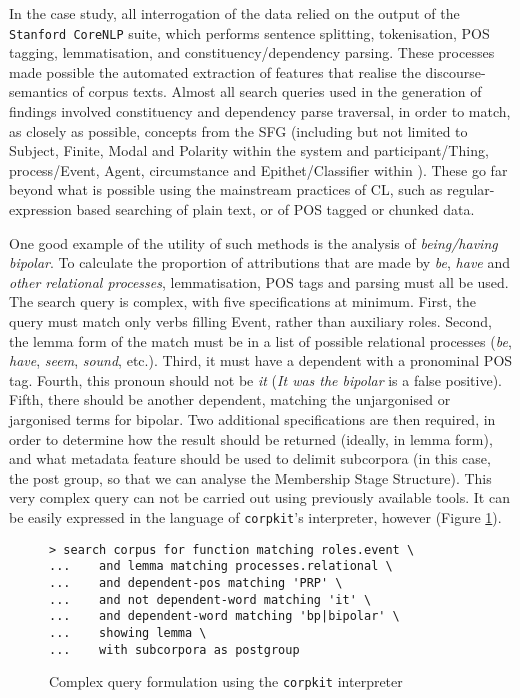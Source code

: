 In the case study, all interrogation of the data relied on the output of the \texttt{Stanford CoreNLP} suite, which performs sentence splitting, tokenisation, \gls{POS} tagging, lemmatisation, and constituency\slash dependency parsing. These processes made possible the automated extraction of  features that realise the \glspl{discourse-semantic} of \gls{corpus} texts. Almost all search queries used in the generation of findings involved constituency and dependency parse traversal, in order to match, as closely as possible, concepts from the \gls{SFG} (including but not limited to Subject, Finite, Modal and Polarity within the  system and participant\slash Thing, process\slash Event, Agent, circumstance and Epithet\slash Classifier within ). These go far beyond what is possible using the mainstream practices of \gls{CL}, such as regular\hyp{}expression based searching of plain text, or of \gls{POS} tagged or chunked data.

One good example of the utility of such methods is the analysis of \emph{being\slash having bipolar}. To calculate the proportion of attributions that are made by \emph{be}, \emph{have} and \emph{other relational processes}, lemmatisation, \gls{POS} tags and parsing must all be used. The search query is complex, with five specifications at minimum. First, the query must match only verbs filling Event, rather than auxiliary roles. Second, the lemma form of the match must be in a list of possible relational processes (\emph{be}, \emph{have}, \emph{seem}, \emph{sound}, etc.). Third, it must have a dependent with a pronominal \gls{POS} tag. Fourth, this pronoun should not be \emph{it} (\emph{It was the bipolar} is a false positive). Fifth, there should be another dependent, matching the unjargonised or jargonised terms for \gls{bipolar}. Two additional specifications are then required, in order to determine how the result should be returned (ideally, in lemma form), and what metadata feature should be used to delimit subcorpora (in this case, the post group, so that we can analyse the Membership Stage Structure). This very complex query can not be carried out using previously available tools. It can be easily expressed in the language of \texttt{corpkit}'s interpreter, however (Figure \ref{fig:complex-query}).

\begin{figure}
\begin{verbatim}
> search corpus for function matching roles.event \
...    and lemma matching processes.relational \
...    and dependent-pos matching 'PRP' \
...    and not dependent-word matching 'it' \
...    and dependent-word matching 'bp|bipolar' \
...    showing lemma \
...    with subcorpora as postgroup
\end{verbatim}
\caption[Complex query formulation]{Complex query formulation using the \texttt{corpkit} interpreter}
\label{fig:complex-query}
\end{figure}

